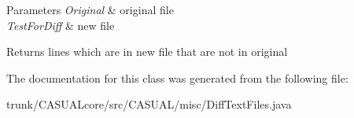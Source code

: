 \begin{DoxyParams}{Parameters}
{\em Original} & original file \\
\hline
{\em Test\-For\-Diff} & new file \\
\hline
\end{DoxyParams}
\begin{DoxyReturn}{Returns}
lines which are in new file that are not in original 
\end{DoxyReturn}


The documentation for this class was generated from the following file\-:\begin{DoxyCompactItemize}
\item 
trunk/\-C\-A\-S\-U\-A\-Lcore/src/\-C\-A\-S\-U\-A\-L/misc/Diff\-Text\-Files.\-java\end{DoxyCompactItemize}
